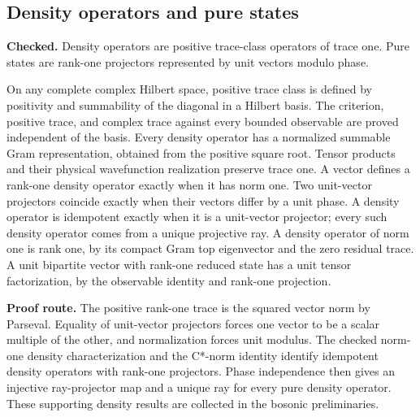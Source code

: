 \subsection{Density operators and pure states}\label{paper:density}
\textbf{Checked.} Density operators are positive trace-class operators of trace one. Pure states are rank-one projectors represented by unit vectors modulo phase. 

On any complete complex Hilbert space, positive trace class is defined by positivity and summability of the diagonal in a Hilbert basis. The criterion, positive trace, and complex trace against every bounded observable are proved independent of the basis. Every density operator has a normalized summable Gram representation, obtained from the positive square root. Tensor products and their physical wavefunction realization preserve trace one. A vector defines a rank-one density operator exactly when it has norm one. Two unit-vector projectors coincide exactly when their vectors differ by a unit phase. A density operator is idempotent exactly when it is a unit-vector projector; every such density operator comes from a unique projective ray. A density operator of norm one is rank one, by its compact Gram top eigenvector and the zero residual trace. A unit bipartite vector with rank-one reduced state has a unit tensor factorization, by the observable identity and rank-one projection.

\textbf{Proof route.} The positive rank-one trace is the squared vector norm by Parseval. Equality of unit-vector projectors forces one vector to be a scalar multiple of the other, and normalization forces unit modulus. The checked norm-one density characterization and the C*-norm identity identify idempotent density operators with rank-one projectors. Phase independence then gives an injective ray-projector map and a unique ray for every pure density operator. These supporting density results are collected in the bosonic preliminaries.

